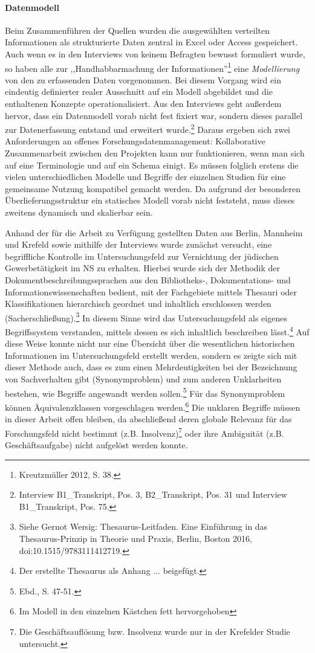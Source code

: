 \paragraph{Datenmodell} Beim Zusammenführen der Quellen wurden die ausgewählten verteilten Informationen als strukturierte Daten zentral in Excel oder Access gespeichert. Auch wenn es in den Interviews von keinem Befragten bewusst formuliert wurde, so haben alle zur ,,Handhabbarmachung der Informationen''\footnote{Kreutzmüller 2012, S. 38.} eine \textit{Modellierung} von den zu erfassenden Daten vorgenommen. Bei diesem Vorgang wird ein eindeutig definierter realer Ausschnitt auf ein Modell abgebildet und die enthaltenen Konzepte operationalisiert. Aus den Interviews geht außerdem hervor, dass ein Datenmodell vorab nicht fest fixiert war, sondern dieses parallel zur Datenerfassung entstand und erweitert wurde.\footnote{Interview B1\_Transkript, Pos. 3, B2\_Transkript, Pos. 31 und Interview B1\_Transkript, Pos. 75.} Daraus ergeben sich zwei Anforderungen an offenes Forschungsdatenmanagement: Kollaborative Zusammenarbeit zwischen den Projekten kann nur funktionieren, wenn man sich auf eine Terminologie und auf ein Schema einigt. Es müssen folglich erstens die vielen unterschiedlichen Modelle und Begriffe der einzelnen Studien für eine gemeinsame Nutzung kompatibel gemacht werden. Da aufgrund der besonderen Überlieferungsstruktur ein statisches Modell vorab nicht feststeht, muss dieses zweitens dynamisch und skalierbar sein.

Anhand der für die Arbeit zu Verfügung gestellten Daten aus Berlin, Mannheim und Krefeld sowie mithilfe der Interviews wurde zunächst versucht, eine begriffliche Kontrolle im Untersuchungsfeld zur Vernichtung der jüdischen Gewerbetätigkeit im NS zu erhalten. Hierbei wurde sich der Methodik der Dokumentbeschreibungssprachen aus den Bibliotheks-, Dokumentations- und Informationswissenschaften bedient, mit der Fachgebiete mittels Thesauri oder Klassifikationen hierarchisch geordnet und inhaltlich erschlossen werden (Sacherschließung).\footnote{Siehe Gernot Wersig: Thesaurus-Leitfaden. Eine Einführung in das Thesaurus-Prinzip in Theorie und Praxis, Berlin, Boston 2016, doi:10.1515/9783111412719.} In diesem Sinne wird das Untersuchungsfeld als eigenes Begriffssystem verstanden, mittels dessen es sich inhaltlich beschreiben lässt.\footnote{Der erstellte Thesaurus als Anhang ... beigefügt.} Auf diese Weise konnte nicht nur eine Übersicht über die wesentlichen historischen Informationen im Untersuchungsfeld erstellt werden, sondern es zeigte sich mit dieser Methode auch, dass es zum einen Mehrdeutigkeiten bei der Bezeichnung von Sachverhalten gibt (Synonymproblem) und zum anderen Unklarheiten bestehen, wie Begriffe angewandt werden sollen.\footnote{Ebd., S. 47-51.} Für das Synonymproblem können Äquivalenzklassen vorgeschlagen werden.\footnote{Im Modell in den einzelnen Kästchen fett hervorgehoben} Die unklaren Begriffe müssen in dieser Arbeit offen bleiben, da abschließend deren globale Relevanz für das Forschungsfeld nicht bestimmt (z.B. Insolvenz)\footnote{Die Geschäftsauflösung bzw. Insolvenz wurde nur in der Krefelder Studie untersucht.} oder ihre Ambiguität (z.B. Geschäftsaufgabe) nicht aufgelöst werden konnte. 

